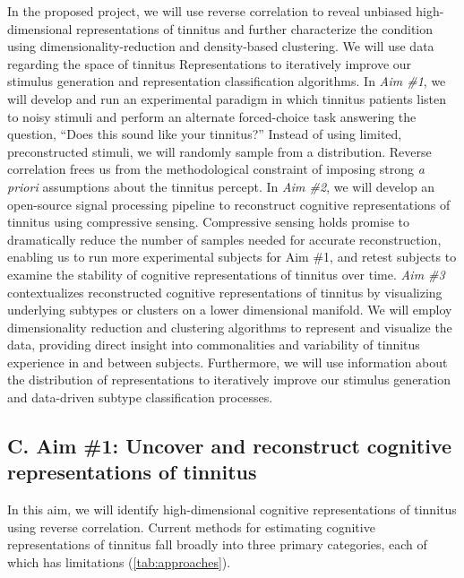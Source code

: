 \documentclass[11pt, notitlepage]{article} %
\begin{document}
In the proposed project, we will use reverse correlation to reveal unbiased high-dimensional
representations of tinnitus and further characterize the condition
using dimensionality-reduction and density-based clustering.
We will use data regarding the space of tinnitus Representations
to iteratively improve our stimulus generation and representation classification algorithms.
In \emph{Aim \#1}, we will develop and run an experimental paradigm
in which tinnitus patients listen to noisy stimuli and perform an alternate forced-choice task
answering the question, ``Does this sound like your tinnitus?''
Instead of using limited, preconstructed stimuli, we will randomly sample from a distribution.
Reverse correlation frees us from the methodological constraint of imposing strong \emph{a priori}
assumptions about the tinnitus percept.
In \emph{Aim \#2}, we will develop an open-source signal processing pipeline
to reconstruct cognitive representations of tinnitus using compressive sensing.
Compressive sensing holds promise to dramatically reduce the number of samples
needed for accurate reconstruction, enabling us to run more experimental subjects for Aim \#1,
and retest subjects to examine the stability of cognitive representations of tinnitus over time.
\emph{Aim \#3} contextualizes reconstructed cognitive representations of tinnitus
by visualizing underlying subtypes or clusters on a lower dimensional manifold.
We will employ dimensionality reduction and clustering algorithms to represent and visualize the data,
providing direct insight into commonalities and variability of tinnitus experience in and between subjects.
Furthermore, we will use information about the distribution of representations
to iteratively improve our stimulus generation and data-driven subtype classification processes.


\subsection*{C. Aim \#1: Uncover and reconstruct cognitive representations of tinnitus}

In this aim, we will identify high-dimensional cognitive representations of tinnitus using reverse correlation.
Current methods for estimating cognitive representations of tinnitus fall broadly into three primary categories,
each of which has limitations (\autoref{tab:approaches}).
\end{document}
